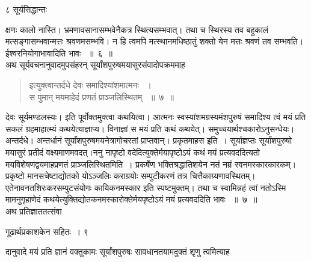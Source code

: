 \documentclass[11pt, openany]{book}
\begin{document}
\newpage


\noindent ८ \hspace{4cm} सूर्यसिद्धान्तः 
\vspace{1cm}

\noindent क्षणः कालो नास्ति। भ्रमणावसानासम्भवेनैकत्र स्थित्यसम्भवात्। तथा च स्थिरस्य तव बहुकालं मत्सङ्गासम्भवान्मत्तः श्रवणमसम्भवि। न हि त्वमपि मत्स्थानमधिष्ठातुं शक्तो येन मत्तः श्रवणं तव सम्भवति। ईश्वरनियोगाभावादिति भावः ~॥~६~॥\\
\noindent अथ सूर्यवचनानुवादमुपसंहरन् सूर्यांशपुरुषमयासुरसंवादोपक्रममाह\textendash


\begin{quote}
 {\ssi इत्युक्त्वान्तर्दधे देवः समादिश्यांशमात्मनः ~।\\
स पुमान् मयमाहेदं प्रणतं प्राञ्जलिस्थितम् ~॥~७~॥}
\end{quote}
\begin{sloppypar}
 देवः सूर्यमण्डलस्यः। इति पूर्वोक्तमुक्त्वा कथयित्वा। आत्मनः स्वस्यांशमग्रस्यमंशपुरुषं समादिश्य त्वं मयं प्रति सकलं ग्रहमाहात्म्यं कथयेत्याज्ञाप्य। विनाज्ञां स मयं प्रति कथं कथयेत्। समुच्चयार्थश्चकारोऽनुसन्धेयः। अन्तर्दधे। अन्तर्धानं सूर्यांशपुरुषमयनेत्रागोचरतां प्राप्तवान्। प्रकृतमाह\textendash स इति~। सूर्याज्ञप्तः सूर्यांशपुरुषो मयासुरं प्रतीदं वक्ष्यमाणमवदत्।ननु नापृष्टो वदेदित्युक्तेर्मयापृष्टोऽयं कथं मयं प्रत्यवददित्यतो मयविशेषणद्वयमाह\textendash प्रणतं प्राञ्जलिस्थितमिति~। प्रकर्षेण भक्तिश्रद्धातिशयेन नतं नम्रं स्वनमस्कारकारकम्। प्रकृष्टो मानसचेष्टाद्योतको योऽञ्जलिः कराग्रयोः सम्पुटीकरणं तत्र चित्तैकाग्र्यणावस्थितम्। एतेनावनतशिरःकरसम्पुटसंयोगः कायिकनमस्कार इति स्पष्टमुक्तम्। तथा च स्वामिन्नहं त्वां नतोऽस्मि मामनुगृहाणेदं कथयेत्युक्तिद्योतकनमस्कारोक्तेर्मयपृष्टोऽयं मयं प्रत्यवददिति भावः ~॥~७~॥\\
 \noindent अथ प्रतिज्ञाततत्संवा\textendash
\end{sloppypar}

\newpage


\hspace{3cm} गूढार्थप्रकाशकेन सहितः~। \hfill ९
\vspace{1cm}
 
\noindent दानुवादे मयं प्रति ज्ञानं वक्तुकामः सूर्यांशपुरुषः सावधानतयामदुक्तं शृणु त्वमित्याह\textendash
\end{document}
